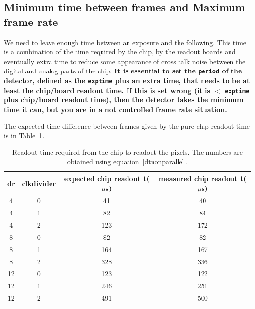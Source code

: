 \documentclass{article}
\begin{document}
\subsection{Minimum time between frames and Maximum frame rate}

We need to leave enough time between an exposure and the following. This time is a combination of the time required by the chip, by the readout boards and eventually extra time to reduce some appearance of cross talk noise between the digital and analog parts of the chip. 
\textbf{It is essential to set the {\tt{period}} of the detector, defined as the {\tt{exptime}} plus an extra time, that needs to be at least the chip/board readout time. If this is set wrong (it is $<$ {\tt{exptime}} plus chip/board readout time), then the detector takes the minimum time it can, but you are in a not controlled frame rate situation.} 

The expected time difference between frames given by the pure chip readout time is in Table~\ref{tchipro}.    
\begin{tiny}
\begin{table}
\begin{flushleft}
\begin{tabular}{|c|c|c|c|}
\hline
\tiny{dr} & \tiny{clkdivider} & \tiny{expected chip readout t($\mu$s)} & \tiny{measured chip readout t($\mu$s)}\\
\hline
4 & 0 & 41 & 40\\
4 & 1 & 82 & 84\\
4 & 2 & 123 & 172\\
\hline
\hline
8 & 0 & 82 & 82\\
8 & 1 & 164 & 167\\
8 & 2 & 328 & 336\\
\hline
\hline
12 & 0 & 123 &122\\
12 & 1 & 246 & 251\\
12 & 2 & 491 & 500\\
\hline
\end{tabular}
\caption{Readout time required from the chip to readout the pixels. The numbers are obtained using equation~\ref{dtnonparallel}.}
\label{tchipro}
\end{flushleft}
\end{table}
\end{tiny}
\end{document}
